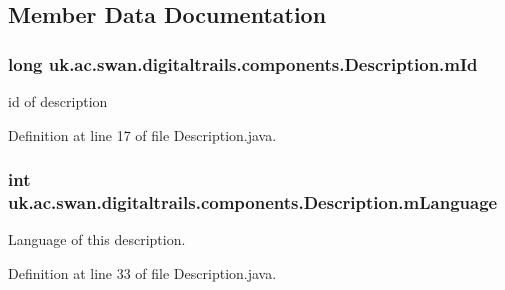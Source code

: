 \subsection{Member Data Documentation}
\hypertarget{classuk_1_1ac_1_1swan_1_1digitaltrails_1_1components_1_1_description_adb9fe3b334fa3513176c6485246d626f}{
\subsubsection[{m\+Id}]{\setlength{\rightskip}{0pt plus 5cm}long uk.\+ac.\+swan.\+digitaltrails.\+components.\+Description.\+m\+Id\hspace{0.3cm}{\ttfamily [protected]}}}\label{classuk_1_1ac_1_1swan_1_1digitaltrails_1_1components_1_1_description_adb9fe3b334fa3513176c6485246d626f}


id of description 



Definition at line 17 of file Description.\+java.

\hypertarget{classuk_1_1ac_1_1swan_1_1digitaltrails_1_1components_1_1_description_aefbca348a59f51f89fd8d1aa9ad84d0c}{
\subsubsection[{m\+Language}]{\setlength{\rightskip}{0pt plus 5cm}int uk.\+ac.\+swan.\+digitaltrails.\+components.\+Description.\+m\+Language\hspace{0.3cm}{\ttfamily [protected]}}}\label{classuk_1_1ac_1_1swan_1_1digitaltrails_1_1components_1_1_description_aefbca348a59f51f89fd8d1aa9ad84d0c}


Language of this description. 



Definition at line 33 of file Description.\+java.

